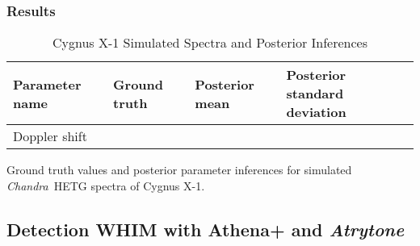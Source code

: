 \documentclass[12pt]{emulateapj}
\newcommand{\project}[1]{\textsl{#1}}
\newcommand{\chandra}{\project{Chandra}}
\begin{document}
\subsubsection{Results}


\begin{table*}[hbtp]
\renewcommand{\arraystretch}{1.3}
\footnotesize
\caption{Cygnus X-1 Simulated Spectra and Posterior Inferences}
\begin{threeparttable} 
\begin{tabularx}{\textwidth}{p{4.0cm}p{4.0cm}p{4.0cm}X}%
\toprule
\bf{Parameter name} & \bf{Ground truth} & \bf{Posterior mean} & \bf{Posterior standard deviation} \\ \midrule
Doppler shift & & & \\ 
\bottomrule
\end{tabularx}
   \begin{tablenotes}
      \item{Ground truth values and posterior parameter inferences for simulated \chandra\ HETG spectra of Cygnus X-1.}
\end{tablenotes}
\end{threeparttable}
\label{tab:cygx1_sims}
\end{table*}




\subsection{Detection WHIM with Athena+ and \textit{Atrytone}}
\end{document}
